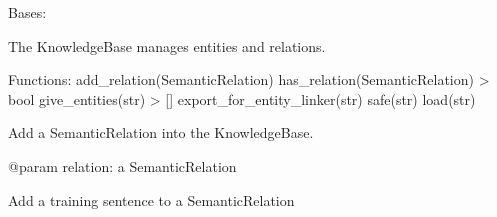 \documentclass[letterpaper,10pt,english]{sphinxmanual}
\begin{document}
\begin{fulllineitems}
\label{\detokenize{medextractor.knowledge:medextractor.knowledge.base.KnowledgeBase}}
\pysigstartsignatures
{}
\pysigstopsignatures
\sphinxAtStartPar
Bases: 

\sphinxAtStartPar
The KnowledgeBase manages entities and relations.

\sphinxAtStartPar
Functions:
add\_relation(SemanticRelation)
has\_relation(SemanticRelation) \sphinxhyphen{}\textgreater{} bool
give\_entities(str) \sphinxhyphen{}\textgreater{} {[}{]}
export\_for\_entity\_linker(str)
safe(str)
load(str)

\begin{fulllineitems}
\label{\detokenize{medextractor.knowledge:medextractor.knowledge.base.KnowledgeBase.add_relation}}
\pysigstartsignatures
{}
\pysigstopsignatures
\sphinxAtStartPar
Add a SemanticRelation into the KnowledgeBase.

\sphinxAtStartPar
@param relation: a SemanticRelation

\end{fulllineitems}


\begin{fulllineitems}
\label{\detokenize{medextractor.knowledge:medextractor.knowledge.base.KnowledgeBase.add_training_example_to_relation}}
\pysigstartsignatures
{}
\pysigstopsignatures
\sphinxAtStartPar
Add a training sentence to a SemanticRelation


\end{fulllineitems}
\end{fulllineitems}
\end{document}
